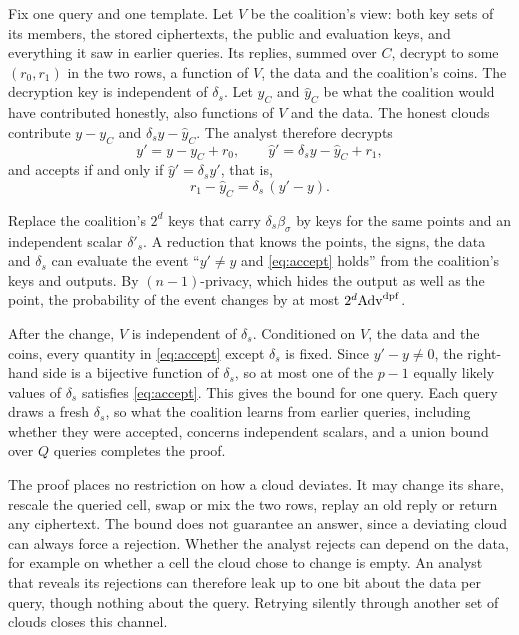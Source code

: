\documentclass[10pt,journal,compsoc]{IEEEtran}
\begin{document}
\begin{IEEEproof}
Fix one query and one template. Let $V$ be the coalition's view: both key sets
of its members, the stored ciphertexts, the public and evaluation keys, and
everything it saw in earlier queries. Its replies, summed over $C$, decrypt to
some $(r_0,r_1)$ in the two rows, a function of $V$, the data and the
coalition's coins. The decryption key is independent of $\delta_s$. Let $y_C$
and $\hat y_C$ be what the coalition would have contributed honestly, also
functions of $V$ and the data. The honest clouds contribute $y-y_C$ and
$\delta_sy-\hat y_C$. The analyst therefore decrypts
\[
y'=y-y_C+r_0,\qquad \hat y'=\delta_sy-\hat y_C+r_1,
\]
and accepts if and only if $\hat y'=\delta_sy'$, that is,
\begin{equation}
\label{eq:accept}
r_1-\hat y_C=\delta_s\,(y'-y).
\end{equation}

Replace the coalition's $2^d$ keys that carry $\delta_s\beta_\sigma$ by keys
for the same points and an independent scalar $\delta'_s$. A reduction that
knows the points, the signs, the data and $\delta_s$ can evaluate the event
``$y'\neq y$ and \eqref{eq:accept} holds'' from the coalition's keys and
outputs. By $(n{-}1)$-privacy, which hides the output as well as the point,
the probability of the event changes by at most $2^d\mathrm{Adv}^{\mathrm{dpf}}$.

After the change, $V$ is independent of $\delta_s$. Conditioned on $V$, the
data and the coins, every quantity in \eqref{eq:accept} except $\delta_s$ is
fixed. Since $y'-y\neq0$, the right-hand side is a bijective function of
$\delta_s$, so at most one of the $p-1$ equally likely values of $\delta_s$
satisfies \eqref{eq:accept}. This gives the bound for one query. Each query
draws a fresh $\delta_s$, so what the coalition learns from earlier queries,
including whether they were accepted, concerns independent scalars, and a
union bound over $Q$ queries completes the proof.
\end{IEEEproof}

The proof places no restriction on how a cloud deviates. It may change its
share, rescale the queried cell, swap or mix the two rows, replay an old reply
or return any ciphertext. The bound does not guarantee an answer, since a
deviating cloud can always force a rejection. Whether the analyst rejects can
depend on the data, for example on whether a cell the cloud chose to change is
empty. An analyst that reveals its rejections can therefore leak up to one bit
about the data per query, though nothing about the query. Retrying silently
through another set of clouds closes this channel.
\end{document}
